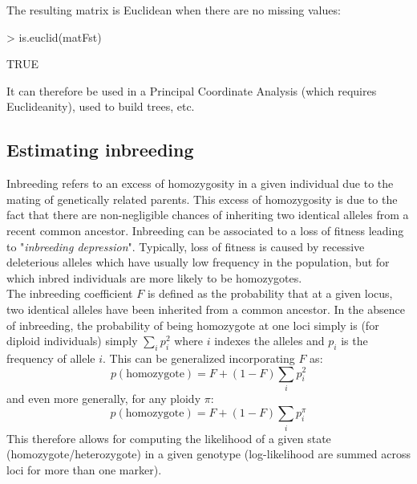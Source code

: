 \documentclass{article}
\begin{document}
The resulting matrix is Euclidean when there are no missing values:
\begin{Schunk}
\begin{Sinput}
> is.euclid(matFst)
\end{Sinput}
\begin{Soutput}
[1] TRUE
\end{Soutput}
\end{Schunk}

It can therefore be used in a Principal Coordinate Analysis (which requires Euclideanity), used to
build trees, etc.







\subsection{Estimating inbreeding}
Inbreeding refers to an excess of homozygosity in a given individual due to the mating of
genetically related parents.
This excess of homozygosity is due to the fact that there are non-negligible chances of inheriting
two identical alleles from a recent common ancestor.
Inbreeding can be associated to a loss of fitness leading to "\textit{inbreeding depression}".
Typically, loss of fitness is caused by recessive deleterious alleles which have usually low
frequency in the population, but for which inbred individuals are more likely to be homozygotes.
\\


The inbreeding coefficient $F$ is defined as the probability that at a given locus, two identical
alleles have been inherited from a common ancestor.
In the absence of inbreeding, the probability of being homozygote at one loci simply is (for diploid
individuals) simply $\sum_i p_i^2$ where $i$ indexes the alleles and $p_i$ is the frequency of
allele $i$.
This can be generalized incorporating $F$ as:
$$
p(\mbox{homozygote}) = F + (1-F) \sum_ip_i^2
$$
and even more generally, for any ploidy $\pi$:
$$
p(\mbox{homozygote}) = F + (1-F) \sum_ip_i^{\pi}
$$
This therefore allows for computing the likelihood of a given state (homozygote/heterozygote) in a
given genotype (log-likelihood are summed across loci for more than one marker).
\\
\end{document}
